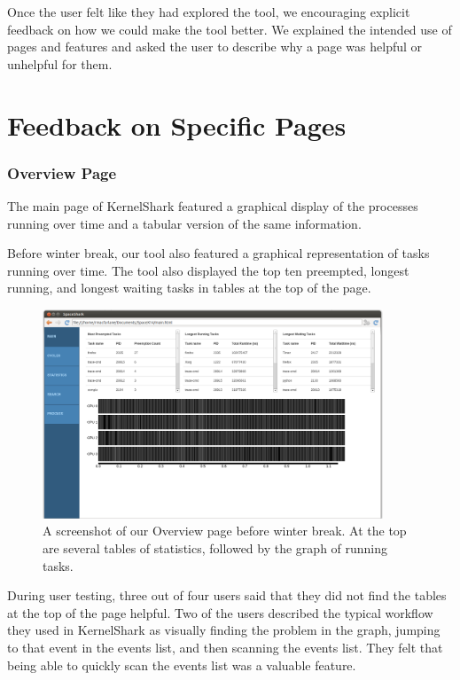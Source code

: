 \documentclass{hmcclinic}
\begin{document}
Once the user felt like they had explored the tool, we encouraging explicit
feedback on how we could make the tool better. We explained the intended use of
pages and features and asked the user to describe why a page was helpful or
unhelpful for them.

\section{Feedback on Specific Pages} %

\subsubsection{Overview Page}

The main page of KernelShark featured a graphical display of the processes
running over time and a tabular version of the same information.

Before winter break, our tool also featured a graphical representation of tasks
running over time. The tool also displayed the top ten preempted, longest
running, and longest waiting tasks in tables at the top of the page. 

\begin{figure}[H]
\begin{center}
\includegraphics[width=4in]{oldMain.png}
\caption{A screenshot of our Overview page before winter break. At the top are
several tables of statistics, followed by the graph of running tasks.}
\end{center}
\end{figure}

During user testing, three out of four users said that they did not find the
tables at the top of the page helpful. Two of the users described the typical
workflow they used in KernelShark as visually finding the problem in the graph,
jumping to that event in the events list, and then scanning the events list.
They felt that being able to quickly scan the events list was a valuable
feature.
\end{document}

